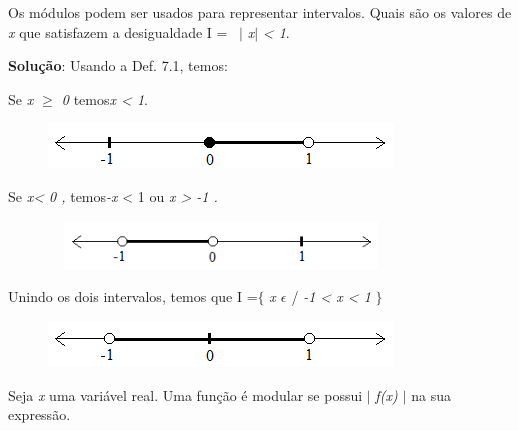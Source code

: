 \begin{texemplo}
Os módulos podem ser usados para representar intervalos. Quais são os valores de \textit{x} que satisfazem a desigualdade  I =~ $ \vert $ \textit{x}$ \vert $  \textit{< 1}. 

\textbf{Solução}: Usando a Def. 7.1, temos:

\quad Se \textit{x $ \geq $  0 }temos\textit{x < 1}.

\begin{figure}[H]
	\begin{Center}
		\includegraphics[width=3.6in,height=0.47in]{capitulos/outras_funcoes/media/image28.png}
	\end{Center}
\end{figure}

\quad Se \textit{x< 0 , }temos\textit{-x} < 1 ou   \textit{x > -1 .}

\begin{figure}[H]
	\begin{Center}
		\includegraphics[width=3.61in,height=0.5in]{capitulos/outras_funcoes/media/image29.png}
	\end{Center}
\end{figure}

\quad Unindo os dois intervalos, temos que I =$ \{ $ \textit{ x $ \epsilon $  \textbf{ }} / \textit{-1 < x < 1} $ \} $  

\begin{figure}[H]
	\begin{Center}
		\includegraphics[width=3.6in,height=0.48in]{capitulos/outras_funcoes/media/image30.png}
	\end{Center}
\end{figure}

\qedsymbol{}

\end{texemplo}
\begin{caixa}
\begin{tdefinicao}
Seja \textit{x} uma variável real. Uma função é modular se possui $ \vert $ \textit{ f(x) $ \vert $ } na sua expressão.
\end{tdefinicao}
\end{caixa}

